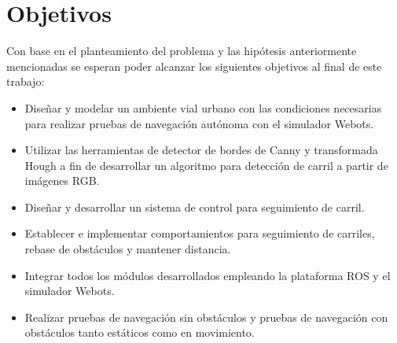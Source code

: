 
\section{Objetivos}

Con base en el planteamiento del problema y las hipótesis anteriormente mencionadas se esperan poder alcanzar los siguientes objetivos al final de este trabajo:
\begin{itemize}
    \item Diseñar y modelar un ambiente vial urbano con las condiciones necesarias para realizar pruebas de navegación autónoma con el simulador Webots.
    \item Utilizar las herramientas de detector de bordes de Canny y transformada Hough a fin de desarrollar un algoritmo para detección de carril a partir de imágenes RGB.
    \item Diseñar y desarrollar un sistema de control para seguimiento de carril.
    \item Establecer e implementar comportamientos para seguimiento de carriles, rebase de obstáculos y mantener distancia.
    \item Integrar todos los módulos desarrollados empleando la plataforma ROS y el simulador Webots.
    \item Realizar pruebas de navegación sin obstáculos y pruebas de navegación con obstáculos tanto estáticos como en movimiento.
\end{itemize}


